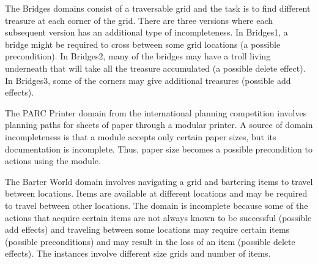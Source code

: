 \documentclass{article}
\begin{document}
The Bridges domains consist of a traversable grid and the task is to find different treasure at each corner of the grid. There are three versions where each subsequent version has an additional type of incompleteness.  In Bridges1, a bridge might be required  to cross between some grid locations (a possible precondition). In Bridges2, many of the bridges may have a troll living underneath that will take all the treasure accumulated (a possible delete effect). In Bridges3, some of the corners may give additional treasures (possible add effects).  


The PARC Printer domain from the international planning competition involves planning paths for sheets of paper through a modular printer.  A source of domain incompleteness is that a module accepts only certain paper sizes, but its documentation is incomplete.  Thus, paper size becomes a possible precondition to actions using the module.  

The Barter World domain involves navigating a grid and bartering items to travel between locations.  Items are available at different locations and may be required to travel between other locations.  The domain is incomplete because some of the actions that acquire certain items are not always known to be successful (possible add effects) and traveling between some locations may require certain items (possible preconditions) and may result in the loss of an item (possible delete effects).  The instances involve different size grids and number of items.

%
%
%
%
%
\end{document}
